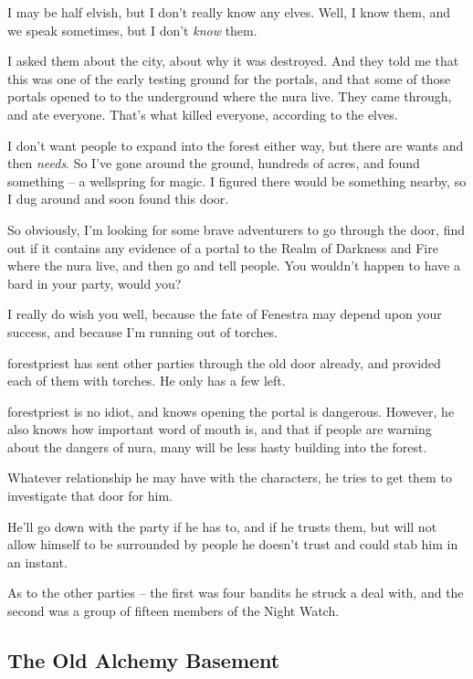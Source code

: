 \begin{multicols}{2}
\begin{speechtext}

	I may be half elvish, but I don't really know any elves.  Well, I know them, and we speak sometimes, but I don't \emph{know} them.

	I asked them about the city, about why it was destroyed.
	And they told me that this was one of the early testing ground for the portals, and that some of those portals opened to to the underground where the nura live.
	They came through, and ate everyone.
	That's what killed everyone, according to the elves.

	I don't want people to expand into the forest either way, but there are wants and then \emph{needs}.  So I've gone around the ground, hundreds of acres, and found something -- a wellspring for magic.  I figured there would be something nearby, so I dug around and soon found this door.

	So obviously, I'm looking for some brave adventurers to go through the door, find out if it contains any evidence of a portal to the Realm of Darkness and Fire where the nura live, and then go and tell people.
	You wouldn't happen to have a bard in your party, would you?

	I really do wish you well, because the fate of Fenestra may depend upon your success, and because I'm running out of torches.

\end{speechtext}

\Gls{forestpriest} has sent other parties through the old door already, and provided each of them with torches.
He only has a few left.

\Gls{forestpriest} is no idiot, and knows opening the portal is dangerous.
However, he also knows how important word of mouth is, and that if people are warning about the dangers of nura, many will be less hasty building into the forest.

Whatever relationship he may have with the characters, he tries to get them to investigate that door for him.

He'll go down with the party if he has to, and if he trusts them, but will not allow himself to be surrounded by people he doesn't trust and could stab him in an instant.

As to the other parties -- the first was four bandits he struck a deal with, and the second was a group of fifteen members of the Night Watch.

\forestpriest

\subsection{The Old Alchemy Basement}\label{old_alchemy_basement}\setcounter{list}{0}


\end{multicols}
